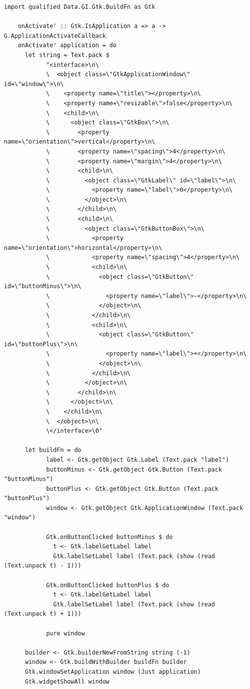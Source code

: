 \documentclass[UdineBachThesis,american,11pt,draft]{PhdThesis}
\begin{document}
  \begin{lstlisting}[gobble=4,basicstyle=\ttfamily\small]
    import qualified Data.GI.Gtk.BuildFn as Gtk

    onActivate' :: Gtk.IsApplication a => a -> G.ApplicationActivateCallback
    onActivate' application = do
      let string = Text.pack $
            "<interface>\n\
            \  <object class=\"GtkApplicationWindow\" id=\"window\">\n\
            \    <property name=\"title\"></property>\n\
            \    <property name=\"resizable\">false</property>\n\
            \    <child>\n\
            \      <object class=\"GtkBox\">\n\
            \        <property name=\"orientation\">vertical</property>\n\
            \        <property name=\"spacing\">4</property>\n\
            \        <property name=\"margin\">4</property>\n\
            \        <child>\n\
            \          <object class=\"GtkLabel\" id=\"label\">\n\
            \            <property name=\"label\">0</property>\n\
            \          </object>\n\
            \        </child>\n\
            \        <child>\n\
            \          <object class=\"GtkButtonBox\">\n\
            \            <property name=\"orientation\">horizontal</property>\n\
            \            <property name=\"spacing\">4</property>\n\
            \            <child>\n\
            \              <object class=\"GtkButton\" id=\"buttonMinus\">\n\
            \                <property name=\"label\">-</property>\n\
            \              </object>\n\
            \            </child>\n\
            \            <child>\n\
            \              <object class=\"GtkButton\" id=\"buttonPlus\">\n\
            \                <property name=\"label\">+</property>\n\
            \              </object>\n\
            \            </child>\n\
            \          </object>\n\
            \        </child>\n\
            \      </object>\n\
            \    </child>\n\
            \  </object>\n\
            \</interface>\0"

      let buildFn = do
            label <- Gtk.getObject Gtk.Label (Text.pack "label")
            buttonMinus <- Gtk.getObject Gtk.Button (Text.pack "buttonMinus")
            buttonPlus <- Gtk.getObject Gtk.Button (Text.pack "buttonPlus")
            window <- Gtk.getObject Gtk.ApplicationWindow (Text.pack "window")

            Gtk.onButtonClicked buttonMinus $ do
              t <- Gtk.labelGetLabel label
              Gtk.labelSetLabel label (Text.pack (show (read (Text.unpack t) - 1)))

            Gtk.onButtonClicked buttonPlus $ do
              t <- Gtk.labelGetLabel label
              Gtk.labelSetLabel label (Text.pack (show (read (Text.unpack t) + 1)))

            pure window

      builder <- Gtk.builderNewFromString string (-1)
      window <- Gtk.buildWithBuilder buildFn builder
      Gtk.windowSetApplication window (Just application)
      Gtk.widgetShowAll window
  \end{lstlisting}
\end{document}
